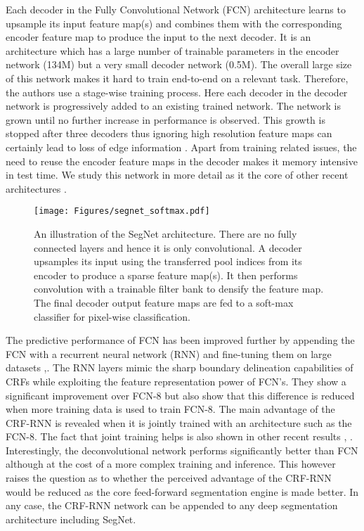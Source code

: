 \documentclass[10pt,journal,compsoc]{IEEEtran}
\begin{document}
Each decoder in the Fully Convolutional Network (FCN) architecture \cite{FCN} learns to upsample its input feature map(s) and combines them with the corresponding encoder feature map to produce the input to the next decoder. It is an architecture which has a large number of trainable parameters in the encoder network (134M) but a very small decoder network (0.5M). The overall large size of this network makes it hard to train end-to-end on a relevant task. Therefore, the authors use a stage-wise training process. Here each decoder in the decoder network is progressively added to an existing trained network. The network is grown until no further increase in performance is observed. This growth is stopped after three decoders thus ignoring high resolution feature maps can certainly lead to loss of edge information \cite{noh2015learning}. Apart from training related issues, the need to reuse the encoder feature maps in the decoder makes it memory intensive in test time. We study this network in more detail as it the core of other recent architectures \cite{ParseNetRabinovich, zheng2015conditional}.

\begin{figure*}[!ht]
\center
\texttt{[image: Figures/segnet\_softmax.pdf]}
\caption{\footnotesize{An illustration of the SegNet architecture. There are no fully connected layers and hence it is only convolutional. A decoder upsamples its input using the transferred pool indices from its encoder to produce a sparse feature map(s). It then performs convolution with a trainable filter bank to densify the feature map. The final decoder output feature maps are fed to a soft-max classifier for pixel-wise classification.}}
\label{SegNetArchitecture}
\end{figure*}

The predictive performance of FCN has been improved further by appending the FCN with a recurrent neural network (RNN) \cite{zheng2015conditional} and fine-tuning them on large datasets \cite{Pascal},\cite{COCO}. The RNN layers mimic the sharp boundary delineation capabilities of CRFs while exploiting the feature representation power of FCN's. They show a significant improvement over FCN-8 but also show that this difference is reduced when more training data is used to train FCN-8. The main advantage of the CRF-RNN is revealed when it is jointly trained with an architecture such as the FCN-8. The fact that joint training helps is also shown in other recent results \cite{UrtasunSegmentation}, \cite{lin2015efficient}. Interestingly, the deconvolutional network \cite{noh2015learning} performs significantly better than FCN although at the cost of a more complex training and inference. This however raises the question as to whether the perceived advantage of the CRF-RNN would be reduced as the core feed-forward segmentation engine is made better. In any case, the CRF-RNN network can be appended to any deep segmentation architecture including SegNet.
\end{document}
